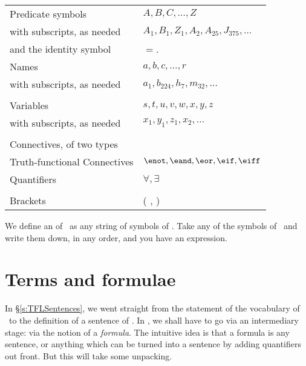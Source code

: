 \begin{center}
\begin{tabular}{l l} \toprule 
Predicate symbols & $A,B,C,…,Z$\\
with subscripts, as needed & $A_{1}, B_{1},Z_{1},A_{2},A_{25},J_{375},…$\\
and the identity symbol &  $=$.
\\
Names & $a,b,c,…, r$\\
with subscripts, as needed & $a_{1}, b_{224}, h_7, m_{32},…$\\
\\
Variables & $s, t, u, v, w, x,y,z$\\
with subscripts, as needed & $x_{1}, y_{1}, z_{1}, x_{2},…$\\
\\
Connectives, of two types & \\
Truth-functional Connectives & $\enot,\eand,\eor,\eif,\eiff$\\
Quantifiers & $\forall, \exists$\\
\\
Brackets &( , )\\
\bottomrule \end{tabular}
\end{center}
We define an  of \FOL\ as any string of symbols of \FOL. Take any of the symbols of \FOL\ and write them down, in any order, and you have an expression.

\section{Terms and formulae}\label{s:termsandf}
In §\ref{s:TFLSentences}, we went straight from the statement of the vocabulary of \TFL\ to the definition of a sentence of \TFL. In \FOL, we shall have to go via an intermediary stage: via the notion of a  \emph{formula}. The intuitive idea is that a formula is any sentence, or anything which can be turned into a sentence by adding quantifiers out front. But this will take some unpacking.

